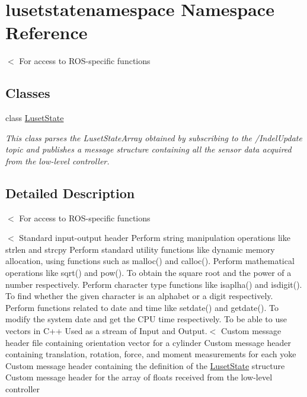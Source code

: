 \hypertarget{namespacelusetstatenamespace}{}\section{lusetstatenamespace Namespace Reference}
\label{namespacelusetstatenamespace}


$<$ For access to R\+O\+S-\/specific functions  


\subsection*{Classes}
\begin{DoxyCompactItemize}
\item 
class \hyperlink{classlusetstatenamespace_1_1LusetState}{Luset\+State}
\begin{DoxyCompactList}\small\item\em This class parses the Luset\+State\+Array obtained by subscribing to the /\+Indel\+Update topic and publishes a message structure containing all the sensor data acquired from the low-\/level controller. \end{DoxyCompactList}\end{DoxyCompactItemize}


\subsection{Detailed Description}
$<$ For access to R\+O\+S-\/specific functions 

$<$ Standard input-\/output header Perform string manipulation operations like strlen and strcpy Perform standard utility functions like dynamic memory allocation, using functions such as malloc() and calloc(). Perform mathematical operations like sqrt() and pow(). To obtain the square root and the power of a number respectively. Perform character type functions like isaplha() and isdigit(). To find whether the given character is an alphabet or a digit respectively. Perform functions related to date and time like setdate() and getdate(). To modify the system date and get the C\+PU time respectively. To be able to use vectors in C++ Used as a stream of Input and Output.$<$ Custom message header file containing orientation vector for a cylinder Custom message header containing translation, rotation, force, and moment measurements for each yoke Custom message header containing the definition of the \hyperlink{classlusetstatenamespace_1_1LusetState}{Luset\+State} structure Custom message header for the array of floats received from the low-\/level controller 